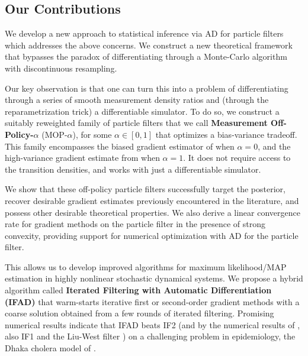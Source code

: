 \documentclass[9pt,twocolumn,twoside]{pnas-new}
\begin{document}


\subsection{Our Contributions}
We develop a new approach to statistical inference via AD for particle filters which addresses the above concerns. We construct a new theoretical framework that bypasses the paradox of differentiating through a Monte-Carlo algorithm with discontinuous resampling.

Our key observation is that one can turn this into a problem of differentiating through a series of smooth measurement density ratios and (through the reparametrization trick) a differentiable simulator. To do so, we construct a suitably reweighted family of particle filters that we call \textbf{Measurement Off-Policy-$\alpha$} (MOP-$\alpha$), for some $\alpha \in [0,1]$ that optimizes a bias-variance tradeoff. This family encompasses the biased gradient estimator of \cite{naesseth18} when $\alpha=0$, and the high-variance gradient estimate from \cite{poyiadjis11, scibior21} when $\alpha=1$. It does not require access to the transition densities, and works with just a differentiable simulator.

We show that these off-policy particle filters successfully target the posterior, recover desirable gradient estimates previously encountered in the literature, and possess other desirable theoretical properties. We also derive a linear convergence rate for gradient methods on the particle filter in the presence of strong convexity, providing support for numerical optimization with AD for the particle filter. 

This allows us to develop improved algorithms for maximum likelihood/MAP estimation in highly nonlinear stochastic dynamical systems. We propose a hybrid algorithm called \textbf{Iterated Filtering with Automatic Differentiation (IFAD)} that warm-starts iterative first or second-order gradient methods with a coarse solution obtained from a few rounds of iterated filtering. Promising numerical results indicate that IFAD beats IF2 (and by the numerical results of \cite{ionides15}, also IF1 and the Liu-West filter \cite{liuwest01}) on a challenging problem in epidemiology, the Dhaka cholera model of \cite{king08}.
\end{document}
